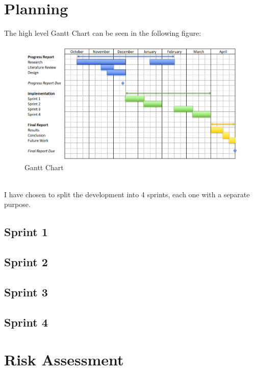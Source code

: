 \documentclass[12pt]{article}
\numberwithin{equation}{section}
\begin{document}
\clearpage 
\section{Planning}
The high level Gantt Chart can be seen in the following figure:
\begin{figure}[h]
    \centering
    \includegraphics[scale=0.75]{GanttChart.png}
    \caption{Gantt Chart}
\end{figure}
\\I have chosen to split the development into 4 sprints, each one with a separate
purpose. 
\subsection{Sprint 1}
\subsection{Sprint 2}
\subsection{Sprint 3}
\subsection{Sprint 4}



\clearpage
\section{Risk Assessment}
\end{document}
